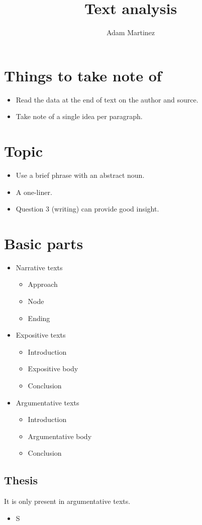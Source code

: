 \documentclass{article}
\title{Text analysis}
\author{Adam Martinez}
\date{}
\begin{document}
\maketitle

\section*{Things to take note of}

\begin{itemize}
    \item Read the data at the end of text on the author and source.
    \item Take note of a single idea per paragraph.
\end{itemize}

\section*{Topic}

\begin{itemize}
    \item Use a brief phrase with an abstract noun.
    \item A one-liner.
    \item Question 3 (writing) can provide good insight.
\end{itemize}

\section*{Basic parts}

\begin{itemize}
    \item Narrative texts
    \begin{itemize}
        \item Approach
        \item Node
        \item Ending
    \end{itemize}
    \item Expositive texts
    \begin{itemize}
        \item Introduction
        \item Expositive body
        \item Conclusion
    \end{itemize}
    \item Argumentative texts
    \begin{itemize}
        \item Introduction
        \item Argumentative body
        \item Conclusion
    \end{itemize}
\end{itemize}

\subsection*{Thesis}

It is only present in argumentative texts.

\begin{itemize}
    \item S
\end{itemize}
\end{document}
